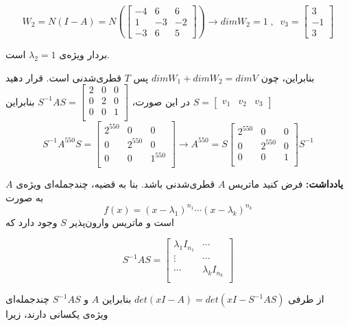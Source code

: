 $$ W_2 = N(I-A)=N(\begin{bmatrix}
-4 & 6 & 6 \\
1 & -3 & -2 \\
-3 & 6 & 5
\end{bmatrix}) \to dimW_2 = 1 \; , \; \; v_3 = \begin{bmatrix}
3 \\
-1 \\
3
\end{bmatrix}$$

بردار ویژه‌ی
$\lambda_2=1$
است.

بنابراین، چون
$dimW_1+dimW_2=dimV$
پس $T$ قطری‌شدنی است. قرار دهید
$S=\begin{bmatrix}
v_1 & v_2 & v_3
\end{bmatrix}$
در این صورت،
$S^{-1}AS = \begin{bmatrix}
2 & 0 & 0 \\
0 & 2 & 0 \\
0 & 0 & 1 \\
\end{bmatrix}$
بنابراین
$$S^{-1}A^{550}S = \begin{bmatrix}
2^{550} & 0 & 0 \\
0 & 2^{550} & 0 \\
0 & 0 & 1^{550} \\
\end{bmatrix} \to A^{550} = S  \begin{bmatrix}
2^{550} & 0 & 0 \\
0 & 2^{550} & 0 \\
0 & 0 & 1 \\
\end{bmatrix} S^{-1} $$

\textbf{یادداشت:}
فرض کنید ماتریس $A$ قطری‌شدنی باشد. بنا به قضیه، چندجمله‌ای ویژه‌ی $A$ به صورت
$$f(x)=(x-\lambda_1)^{n_1} \cdots (x-\lambda_k)^{n_k}$$
است و ماتریس وارون‌پذیر $S$ وجود دارد که

$$S^{-1}AS = \begin{bmatrix}
\lambda_1 I_{n_1} & \cdots \\
\vdots & \cdots \\
 \cdots & \lambda_k I_{n_k}\\
\end{bmatrix}$$

از طرفی
$det(xI-A)=det(xI-S^{-1}AS)$
بنابراین $A$ و $S^{-1}AS$ چندجمله‌ای ویژه‌ی یکسانی دارند، زیرا

